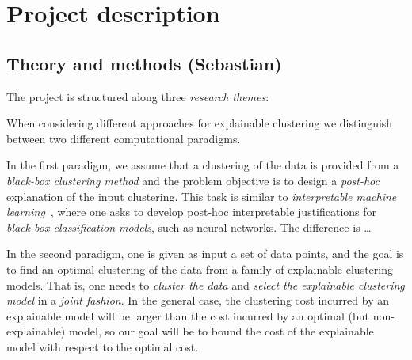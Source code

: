 \documentclass[a4paper,11pt]{article}
\begin{document}
\section{Project description}


\subsection{Theory and methods {\color{teal}(Sebastian)}}


The project is structured along three {\em research themes}:

\begin{description}
\setlength{\itemsep}{-2pt}
\item[\rto.~\newmodels\,:] 

\item[\rtw.~\clusterings\,:] 

\item[\rth.~\covariates\,:]
\end{description}

When considering different approaches for explainable clustering we distinguish between 
two different computational paradigms. 
\begin{description}
\setlength{\itemsep}{-2pt}
\item[\posthoc\,:]
In the first paradigm, we assume that a clustering of the data is provided 
from a \emph{black-box clustering method} and the problem objective is to design 
a \emph{post-hoc} explanation of the input clustering.
This task is similar to \emph{interpretable machine learning}~\cite{XXX}, 
where one asks to develop post-hoc interpretable justifications for 
\emph{black-box classification models}, such as neural networks. 
The difference is \ldots 
\item[\joint\,:]
In the second paradigm, one is given as input a set of data points, 
and the goal is to find an optimal clustering of the data
from a family of explainable clustering models.
That is, one needs to \emph{cluster the data} and \emph{select the explainable clustering model}
in a \emph{joint fashion}.
In the general case, the clustering cost incurred by an explainable model 
will be larger than the cost incurred by an optimal (but non-explainable) model, 
so our goal will be to bound the cost of the explainable model with respect to the optimal cost.
\end{description}
\end{document}
